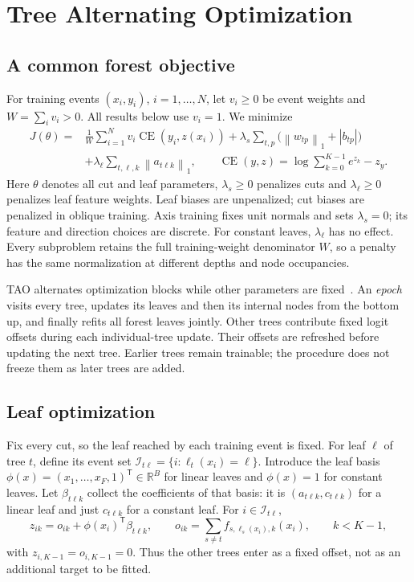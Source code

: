 \documentclass[11pt,a4paper]{article}
\newcommand{\CE}{\operatorname{CE}}
\newcommand{\normone}[1]{\left\lVert #1\right\rVert_1}
\begin{document}
\section{Tree Alternating Optimization}
\label{sec:training}
\subsection{A common forest objective}
For training events $(x_i,y_i)$, $i=1,\ldots,N$, let $v_i\geq0$ be event weights
and $W=\sum_i v_i>0$. All results below use $v_i=1$. We minimize
\begin{align}
 J(\theta)={}&\frac1W\sum_{i=1}^N v_i\CE(y_i,z(x_i))
 +\lambda_s\sum_{t,p}\big(\normone{w_{tp}}+|b_{tp}|\big)\nonumber\\
 &+\lambda_\ell\sum_{t,\ell,k}\normone{a_{t\ell k}},
 \qquad \CE(y,z)=\log\sum_{k=0}^{K-1}e^{z_k}-z_y.
 \label{eq:objective}
\end{align}
Here $\theta$ denotes all cut and leaf parameters, $\lambda_s\geq0$ penalizes
cuts and $\lambda_\ell\geq0$ penalizes leaf feature weights. Leaf biases are
unpenalized; cut biases are penalized in oblique training. Axis training fixes
unit normals and sets $\lambda_s=0$; its feature and direction choices are discrete. For constant leaves, $\lambda_\ell$
has no effect. Every subproblem retains the full training-weight denominator
$W$, so a penalty has the same normalization at different depths and node
occupancies.

TAO alternates optimization blocks while other parameters are fixed~\cite{tao2018}.
An \emph{epoch} visits every tree, updates its leaves and then its internal
nodes from the bottom up, and finally refits all forest leaves jointly. Other
trees contribute fixed logit offsets during each individual-tree update.
Their offsets are refreshed before updating the next tree. Earlier trees
remain trainable; the procedure does not freeze them as later trees are added.

\subsection{Leaf optimization}
Fix every cut, so the leaf reached by each training event is fixed. For leaf
$\ell$ of tree $t$, define its event set
$\mathcal I_{t\ell}=\{i:\ell_t(x_i)=\ell\}$. Introduce the leaf basis
$\phi(x)=(x_1,\ldots,x_F,1)^{\mathsf T}\in\mathbb R^B$ for linear leaves
and $\phi(x)=1$ for constant leaves. Let $\beta_{t\ell k}$ collect the
coefficients of that basis: it is $(a_{t\ell k},c_{t\ell k})$ for a linear
leaf and just $c_{t\ell k}$ for a constant leaf. For $i\in\mathcal I_{t\ell}$,
\begin{equation}
 z_{ik}=o_{ik}+\phi(x_i)^{\mathsf T}\beta_{t\ell k},\qquad
 o_{ik}=\sum_{s\ne t}f_{s,\ell_s(x_i),k}(x_i),\qquad k<K-1,
 \label{eq:leaf-offset}
\end{equation}
with $z_{i,K-1}=o_{i,K-1}=0$. Thus the other trees enter as a fixed offset,
not as an additional target to be fitted.
\end{document}
